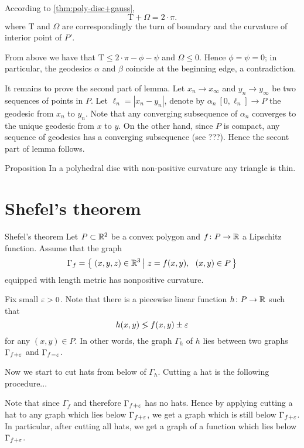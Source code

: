 According to \ref{thm:poly-disc+gauss},\[\mathrm{T}+\Omega=2\cdot\pi.\]
where $\mathrm{T}$ and $\Omega$ 
are correspondingly 
the turn of boundary 
and the curvature of interior point of $P'$.

From above we have that $\mathrm{T}\le 2\cdot\pi -\phi-\psi$
and $\Omega\le 0$.
Hence $\phi=\psi=0$;
in particular, the geodesics $\alpha$ and $\beta$ coincide at the beginning edge,
a contradiction.

It remains to prove the second part of lemma.
Let $x_n\to x_\infty$ and $y_n\to y_\infty$ be two sequences of points in $P$.
Let $\ell_n=|x_n-y_n|$,
denote by $\alpha_n\:[0,\ell_n]\to P$ 
the geodesic from $x_n$ to $y_n$.
Note that any converging subsequence of $\alpha_n$ converges to the unique geodesic from $x$ to $y$.
On the other hand, since $P$ is compact,
any sequence of geodesics has a converging subsequence (see ???).
Hence the secont part of lemma follows. 
\qeds


\begin{thm}{Proposition}
In a polyhedral disc with non-positive curvature
any triangle is thin.
\end{thm}


\section{Shefel's theorem}

\begin{thm}{Shefel's theorem}\label{thm:shefel}
Let $P\subset \mathbb{R}^2$ be a convex polygon
and $f\colon P\to \mathbb{R}$ a Lipschitz function.
Assume that the graph 
\[\Gamma_f=\set{(x,y,z)\in\RR^3}{z=f(x,y),\ \ (x,y)\in P}\]
equipped with length metric has nonpositive curvature.
\end{thm}

Fix small $\varepsilon>0$.
Note that there is a piecewise linear function $h\colon P\to \mathbb{R}$ such that 
$$h(x,y)\lg f(x,y)\pm\eps$$
for any $(x,y)\in P$.
In other words, the graph $\Gamma_h$ of $h$ lies between 
two graphs $\Gamma_{f+\varepsilon}$
 and  $\Gamma_{f-\varepsilon}$.

Now we start to cut hats from below of $\Gamma_h$.
Cutting a hat is the following procedure...

Note that since $\Gamma_{f}$ and therefore $\Gamma_{f+\varepsilon}$ has no hats.
Hence by applying cutting a hat to any graph which lies below $\Gamma_{f+\varepsilon}$, we get a graph which is still below $\Gamma_{f+\varepsilon}$.
In particular, after cutting all hats,
we get a graph of a function which lies below $\Gamma_{f+\varepsilon}$.

